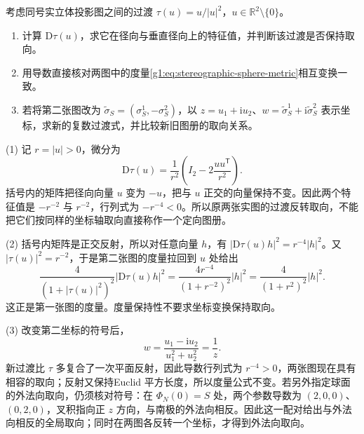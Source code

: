 \begin{exercise}
	\label{g1:ex:stereographic-transition-orientation}
	考虑同号实立体投影图之间的过渡 \(\tau(u)=u/|u|^2\)，\(u\in\mathbb R^2\setminus\{0\}\)。
	\begin{enumerate}
		\item 计算 \(\mathrm{D}\tau(u)\)，求它在径向与垂直径向上的特征值，并判断该过渡是否保持取向。
		\item 用导数直接核对两图中的度量\eqref{g1:eq:stereographic-sphere-metric}相互变换一致。
		\item 若将第二张图改为 \(\widetilde\sigma_S=(\sigma_S^1,-\sigma_S^2)\)，以 \(z=u_1+\mathrm i u_2\)、\(w=\widetilde\sigma_S^1+\mathrm i\widetilde\sigma_S^2\) 表示坐标，求新的复数过渡式，并比较新旧图册的取向关系。
	\end{enumerate}
\end{exercise}
\begin{solution}
	(1) 记 \(r=|u|>0\)，微分为
	\[
		\mathrm{D}\tau(u)=\frac1{r^2}\left(I_2-2\frac{uu^{\mathsf T}}{r^2}\right).
	\]
	括号内的矩阵把径向向量 \(u\) 变为 \(-u\)，把与 \(u\) 正交的向量保持不变。因此两个特征值是 \(-r^{-2}\) 与 \(r^{-2}\)，行列式为 \(-r^{-4}<0\)。所以原两张实图的过渡反转取向，不能把它们按同样的坐标轴取向直接称作一个定向图册。

	(2) 括号内矩阵是正交反射，所以对任意向量 \(h\)，有 \(|\mathrm{D}\tau(u)h|^2=r^{-4}|h|^2\)。又 \(|\tau(u)|^2=r^{-2}\)，于是第二张图的度量拉回到 \(u\) 处给出
	\[
		\frac{4}{(1+|\tau(u)|^2)^2}|\mathrm{D}\tau(u)h|^2
		=\frac{4r^{-4}}{(1+r^{-2})^2}|h|^2
		=\frac{4}{(1+r^2)^2}|h|^2.
	\]
	这正是第一张图的度量。度量保持性不要求坐标变换保持取向。

	(3) 改变第二坐标的符号后，
	\[
		w=\frac{u_1-\mathrm i u_2}{u_1^2+u_2^2}=\frac1z.
	\]
	新过渡比 \(\tau\) 多复合了一次平面反射，因此导数行列式为 \(r^{-4}>0\)，两张图现在具有相容的取向；反射又保持Euclid 平方长度，所以度量公式不变。若另外指定球面的外法向取向，仍须核对符号：在 \(\Phi_N(0)=S\) 处，两个参数导数为 \((2,0,0)\)、\((0,2,0)\)，叉积指向正 \(z\) 方向，与南极的外法向相反。因此这一配对给出与外法向相反的全局取向；同时在两图各反转一个坐标，才得到外法向取向。
\end{solution}

